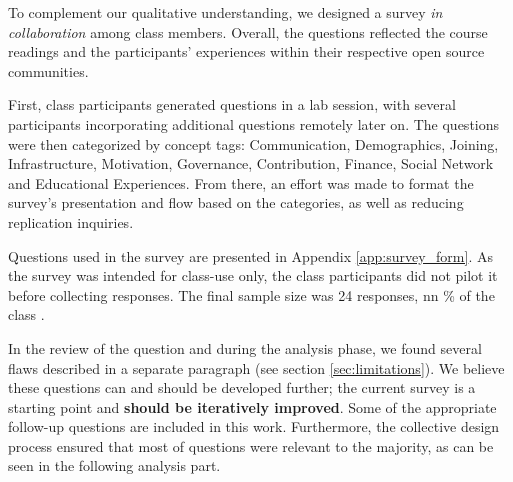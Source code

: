 

To complement our qualitative understanding, we designed a survey {\it in collaboration} among class members. Overall, the questions reflected the course readings and the participants' experiences within their respective open source communities. 

First, class participants generated questions in a lab session, with several participants incorporating additional questions remotely later on. The questions were then categorized by concept tags: Communication, Demographics, Joining, Infrastructure, Motivation, Governance, Contribution, Finance, Social Network and Educational Experiences. From there, an effort was made to format the survey's presentation and flow based on the categories, as well as reducing replication inquiries.

Questions used in the survey  are presented in Appendix \ref{app:survey_form}. As the survey was intended for class-use only, the class participants did not pilot it before collecting responses. The final sample size was 24 responses, nn \% of the class .

In the review of the question and during the analysis phase, we found several flaws described in a separate paragraph (see section \ref{sec:limitations}). We believe these questions can and should be developed further; the current survey is a starting point and {\bf should be iteratively improved}. Some of the appropriate follow-up questions are included in this work. Furthermore, the collective design process ensured that most of questions were relevant to the majority, as can be seen in the following analysis part.